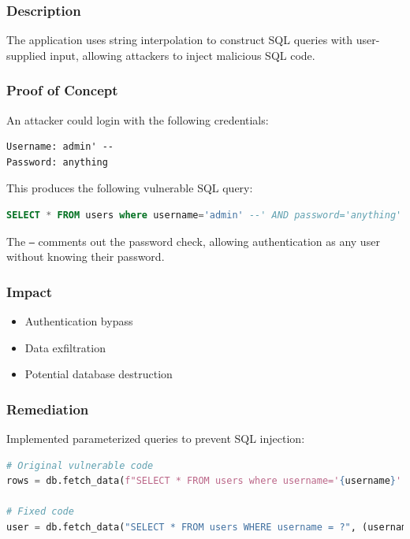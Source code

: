 \documentclass[11pt,a4paper]{article}
\newenvironment{vulnerability}[3]{%
    \begin{tcolorbox}[
        colback=white,
        colframe=#1,
        fonttitle=\bfseries\color{white},
        coltitle=#1,
        title=#2: #3
    ]
}{%
    \end{tcolorbox}
}
\begin{document}
\begin{vulnerability}{criticalcolor}{Critical}{SQL Injection}
\subsubsection*{Description}
The application uses string interpolation to construct SQL queries with user-supplied input, allowing attackers to inject malicious SQL code.

\subsubsection*{Proof of Concept}
An attacker could login with the following credentials:

\begin{lstlisting}[language={}]
Username: admin' --
Password: anything
\end{lstlisting}

This produces the following vulnerable SQL query:

\begin{lstlisting}[language=SQL]
SELECT * FROM users where username='admin' --' AND password='anything'
\end{lstlisting}

The \texttt{--} comments out the password check, allowing authentication as any user without knowing their password.

\subsubsection*{Impact}
\begin{itemize}
    \item Authentication bypass
    \item Data exfiltration
    \item Potential database destruction
\end{itemize}

\subsubsection*{Remediation}
Implemented parameterized queries to prevent SQL injection:

\begin{lstlisting}[language=Python]
# Original vulnerable code
rows = db.fetch_data(f"SELECT * FROM users where username='{username}' AND password='{password}'")

# Fixed code
user = db.fetch_data("SELECT * FROM users WHERE username = ?", (username,))
\end{lstlisting}
\end{vulnerability}
\end{document}
